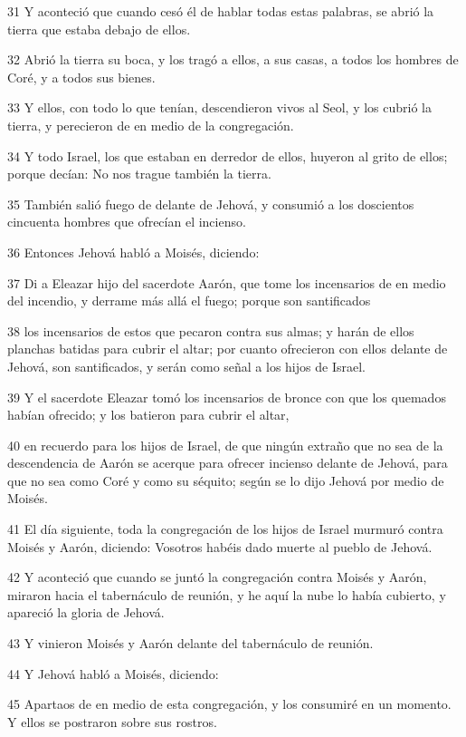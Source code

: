 \par 31 Y aconteció que cuando cesó él de hablar todas estas palabras, se abrió la tierra que estaba debajo de ellos.
\par 32 Abrió la tierra su boca, y los tragó a ellos, a sus casas, a todos los hombres de Coré, y a todos sus bienes.
\par 33 Y ellos, con todo lo que tenían, descendieron vivos al Seol, y los cubrió la tierra, y perecieron de en medio de la congregación.
\par 34 Y todo Israel, los que estaban en derredor de ellos, huyeron al grito de ellos; porque decían: No nos trague también la tierra. 
\par 35 También salió fuego de delante de Jehová, y consumió a los doscientos cincuenta hombres que ofrecían el incienso.
\par 36 Entonces Jehová habló a Moisés, diciendo:
\par 37 Di a Eleazar hijo del sacerdote Aarón, que tome los incensarios de en medio del incendio, y derrame más allá el fuego; porque son santificados
\par 38 los incensarios de estos que pecaron contra sus almas; y harán de ellos planchas batidas para cubrir el altar; por cuanto ofrecieron con ellos delante de Jehová, son santificados, y serán como señal a los hijos de Israel.
\par 39 Y el sacerdote Eleazar tomó los incensarios de bronce con que los quemados habían ofrecido; y los batieron para cubrir el altar,
\par 40 en recuerdo para los hijos de Israel, de que ningún extraño que no sea de la descendencia de Aarón se acerque para ofrecer incienso delante de Jehová, para que no sea como Coré y como su séquito; según se lo dijo Jehová por medio de Moisés.
\par 41 El día siguiente, toda la congregación de los hijos de Israel murmuró contra Moisés y Aarón, diciendo: Vosotros habéis dado muerte al pueblo de Jehová.
\par 42 Y aconteció que cuando se juntó la congregación contra Moisés y Aarón, miraron hacia el tabernáculo de reunión, y he aquí la nube lo había cubierto, y apareció la gloria de Jehová.
\par 43 Y vinieron Moisés y Aarón delante del tabernáculo de reunión.
\par 44 Y Jehová habló a Moisés, diciendo:
\par 45 Apartaos de en medio de esta congregación, y los consumiré en un momento. Y ellos se postraron sobre sus rostros.
